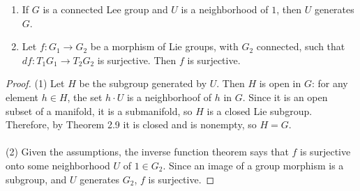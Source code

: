 \begin{corollary}
  \hfill
  \begin{enumerate}[label=\textnormal{(\arabic*)}]
  \item If $G$ is a connected Lee group and $U$ is a neighborhood of $1$,
    then $U$ generates $G$.
  \item Let $f\colon G_1\to G_2$ be a morphism of Lie groups, with $G_2$
    connected, such that $df\colon T_1G_1\to T_2G_2$ is surjective. Then
    $f$ is surjective.
  \end{enumerate}
\end{corollary}
\begin{proof}
  (1) Let $H$ be the subgroup generated by $U$. Then $H$ is open in $G$:
  for any element $h\in H$, the set $h\cdot U$ is a neighborhoof of $h$ in
  $G$. Since it is an open subset of a manifold, it is a submanifold, so
  $H$ is a closed Lie subgroup. Therefore, by Theorem 2.9 it is closed and
  is nonempty, so $H=G$.
  \\\\
  (2) Given the assumptions, the inverse function theorem says that $f$ is
  surjective onto some neighborhood $U$ of $1\in G_2$. Since an image of a
  group morphism is a subgroup, and $U$ generates $G_2$, $f$ is surjective.
\end{proof}

